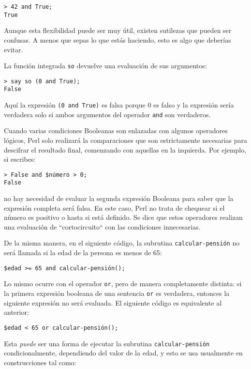 \begin{verbatim}
> 42 and True;
True
\end{verbatim}
%
Aunque esta flexibilidad puede ser muy útil, existen 
sutilezas que pueden ser confusas. A menos que sepas
lo que estás haciendo, esto es algo que deberías evitar.

La función integrada {\tt so} devuelve una evaluación 
de sus argumentos:

\begin{verbatim}
> say so (0 and True);
False
\end{verbatim}
%
Aquí la expresión {\tt (0 and True)} es falsa porque 0 es falso
y la expresión sería verdadera solo si ambos argumentos del operador
{\tt and} son verdaderos.

Cuando varias condiciones Booleanas son enlazadas con algunos
operadores lógicos, Perl solo realizará la comparaciones que son
estrictamente necesarias para descifrar el resultado final,
comenzando con aquellas en la izquierda. Por ejemplo, si escribes:

\begin{verbatim}
> False and $número > 0;
False
\end{verbatim}
%
no hay necesidad de evaluar la segunda expresión Booleana
para saber que la expresión completa será falsa. En este caso,
Perl no trata de chequear si el número es positivo o hasta si
está definido. Se dice que estos operadores realizan una evaluación
de ``cortocircuito`` con las condiciones innecesarias.

De la misma manera, en el siguiente código, la subrutina 
{\tt calcular-pensión} no será llamada si la edad de la persona
es menos de 65:

\begin{verbatim}
$edad >= 65 and calcular-pensión();
\end{verbatim}
%
Lo mismo ocurre con el operador {\tt or}, pero de
manera completamente distinta: si la primera expresión booleana
de una sentencia {\tt or} es verdadera, entonces la siguiente
expresión no será evaluada. El siguiente código es equivalente
al anterior:

\begin{verbatim}
$edad < 65 or calcular-pensión();
\end{verbatim}
% 
Esta \emph{puede} ser una forma de ejecutar la subrutina
{\tt calcular-pensión} condicionalmente, dependiendo del 
valor de la edad, y esto se usa usualmente en construcciones
tal como:

